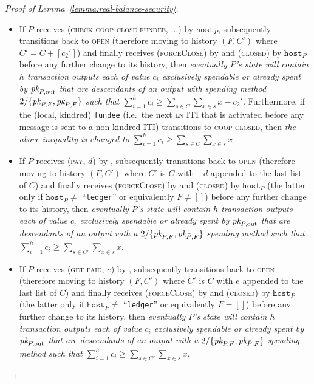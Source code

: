 \begin{proof}[Proof of Lemma~\ref{lemma:real-balance-security}]
\begin{itemize}
{    each of value $c_i$ exclusively spendable or already spent by $\pk{P,
    \mathrm{out}}$ that are descendants of an output with spending method
    $2/\{\pk{P, F}, \pk{\bar{P}, F}\}$ such that $\sum\limits_{i=1}^h c_i \geq
    \sum\limits_{s \in C} \sum\limits_{x \in s} x$.}
    \item If $P$ receives (\textsc{check coop close fundee}, $\dots$) by
    $\texttt{host}_P$, subsequently transitions back to \textsc{open} (therefore
    moving to history $(F, C')$ where $C' = C + [c_2']$) and finally receives
    (\textsc{forceClose}) by \environment and (\textsc{closed}) by
    $\texttt{host}_P$ before any further change to its history, then
    \emph{eventually $P$'s \ledger state will contain $h$ transaction outputs
    each of value $c_i$ exclusively spendable or already spent by $\pk{P,
    \mathrm{out}}$ that are descendants of an output with spending method
    $2/\{\pk{P, F}, \pk{\bar{P}, F}\}$ such that $\sum\limits_{i=1}^h c_i \geq
    \sum\limits_{s \in C} \sum\limits_{x \in s} x - c_2'$.} Furthermore, if the
    (local, kindred) \texttt{fundee} (i.e.\ the next \textsc{ln} ITI that is
    activated before any message is sent to a non-kindred ITI) transitions to
    \textsc{coop closed}, then \emph{the above inequality is changed to
    $\sum\limits_{i=1}^h c_i \geq \sum\limits_{s \in C} \sum\limits_{x \in s}
    x$.}
    \item If $P$ receives (\textsc{pay}, $d$) by \environment, subsequently
    transitions back to \textsc{open} (therefore moving to history $(F, C')$
    where $C'$ is $C$ with $-d$ appended to the last list of $C$) and finally
    receives (\textsc{forceClose}) by \environment and (\textsc{closed}) by
    $\texttt{host}_P$ (the latter only if $\texttt{host}_P \neq$ ``\texttt{ledger}'' or
    equivalently $F \neq []$) before any further change to its history, then
    \emph{eventually $P$'s \ledger state will contain $h$ transaction outputs
    each of value $c_i$ exclusively spendable or already spent by $\pk{P,
    \mathrm{out}}$ that are descendants of an output with a $2/\{\pk{P, F},
    \pk{\bar{P}, F}\}$ spending method such that $\sum\limits_{i=1}^h c_i \geq
    \sum\limits_{s \in C'} \sum\limits_{x \in s} x$}.
    \item If $P$ receives (\textsc{get paid}, $e$) by \environment, subsequently
    transitions back to \textsc{open} (therefore moving to history $(F, C')$
    where $C'$ is $C$ with $e$ appended to the last list of $C$) and finally
    receives (\textsc{forceClose}) by \environment and (\textsc{closed}) by
    $\texttt{host}_P$ (the latter only if $\texttt{host}_P \neq$ ``\texttt{ledger}'' or
    equivalently $F = []$) before any further change to its history, then
    \emph{eventually $P$'s \ledger state will contain $h$ transaction outputs
    each of value $c_i$ exclusively spendable or already spent by $\pk{P,
    \mathrm{out}}$ that are descendants of an output with a $2/\{\pk{P, F},
    \pk{\bar{P}, F}\}$ spending method such that $\sum\limits_{i=1}^h c_i \geq
    \sum\limits_{s \in C'} \sum\limits_{x \in s} x$}.
  \end{itemize}


\end{proof}
